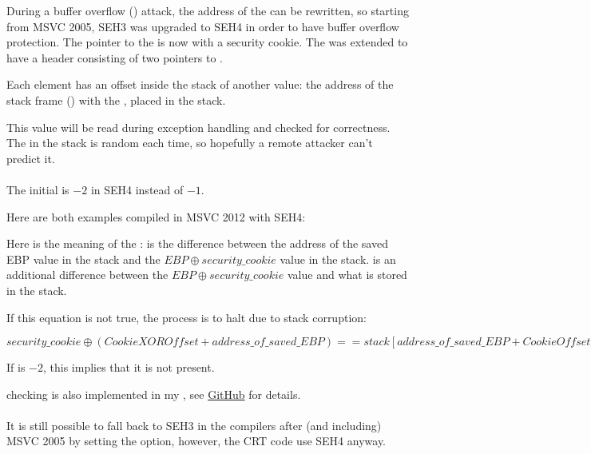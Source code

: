
\myindex{\BufferOverflow}
During a buffer overflow () attack, the address of the  
can be rewritten, so starting from MSVC 2005, SEH3 was upgraded to SEH4 in order to have buffer overflow protection.
The pointer to the  is now  with a \gls{security cookie}.
The  was extended to have a header consisting of two pointers to .

Each element has an offset inside the stack of another value: 
the address of the \gls{stack frame} (\EBP)  with the  , placed in the stack.

This value will be read during exception handling and checked for correctness.
The  in the stack is random each time, so hopefully a remote attacker can't predict it. \\
\\
The initial  is $-2$ in SEH4 instead of $-1$.

\def\SEHfour{1}


Here are both examples compiled in MSVC 2012 with SEH4:





Here is the meaning of the :  
is the difference between the address of the saved EBP value in the stack
and the $EBP \oplus security\_cookie$ value in the stack.
 is an additional difference between the 
$EBP \oplus security\_cookie$ value and what is
stored in the stack.

If this equation is not true, the process is to halt due to stack corruption:

\begin{center}
$security\_cookie \oplus (CookieXOROffset + address\_of\_saved\_EBP) == stack[address\_of\_saved\_EBP + CookieOffset]$
\end{center}

If  is $-2$, this implies that it is not present.

 checking is also implemented in my \tracer{},
see \href{http://go.yurichev.com/17061}{GitHub} for details.\\
\\
It is still possible to fall back to SEH3 in the compilers after 
(and including) MSVC 2005 by setting the  option,
however, the \ac{CRT} code use SEH4 anyway.


